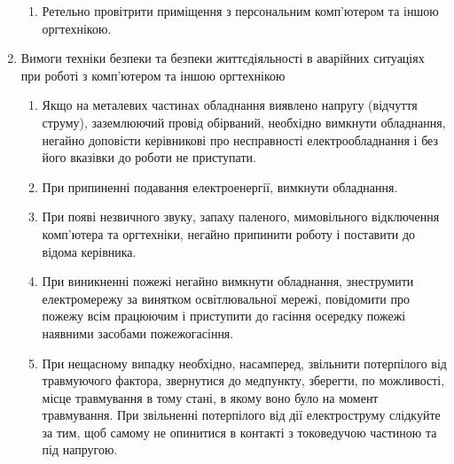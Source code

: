 \begin{enumerate}
\begin{enumerate}
        \item Ретельно провітрити приміщення з персональним комп'ютером та іншою оргтехнікою.
    \end{enumerate}
    \item Вимоги техніки безпеки та безпеки життєдіяльності в аварійних ситуаціях при роботі з комп'ютером та іншою оргтехнікою
    \begin{enumerate}
        \item Якщо на металевих частинах обладнання виявлено напругу (відчуття струму), заземлюючий провід обірваний, необхідно вимкнути обладнання, негайно доповісти керівникові про несправності електрообладнання і без його вказівки до роботи не приступати.
        \item При припиненні подавання електроенергії, вимкнути обладнання.
        \item При появі незвичного звуку, запаху паленого, мимовільного відключення комп'ютера та оргтехніки, негайно припинити роботу і поставити до відома керівника.
        \item При виникненні пожежі негайно вимкнути обладнання, знеструмити електромережу за винятком освітлювальної мережі, повідомити про пожежу всім працюючим і приступити до гасіння осередку пожежі наявними засобами пожежогасіння.
        \item При нещасному випадку необхідно, насамперед, звільнити потерпілого від травмуючого фактора, звернутися до медпункту, зберегти, по можливості, місце травмування в тому стані, в якому воно було на момент травмування. При звільненні потерпілого від дії електроструму слідкуйте за тим, щоб самому не опинитися в контакті з токоведучою частиною та під напругою.
    \end{enumerate}
\end{enumerate} 